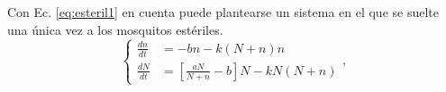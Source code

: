 \documentclass[twocolumn,aps,prl]{revtex4-1}
\begin{document}
Con Ec. \ref{eq:esteril1} en cuenta puede plantearse un sistema en el que se suelte una única vez a los mosquitos estériles.
\begin{equation} \label{eq:unaLiberacion}
    \left\lbrace
    \begin{aligned}
        \frac{d n}{d t}&=  -b n - k (N+n) n \\
        \frac{d N}{d t}&=\left[\frac{a N}{N+n}-b\right] N- k N(N+n)
    \end{aligned}
    \right. ,
\end{equation}
\end{document}
